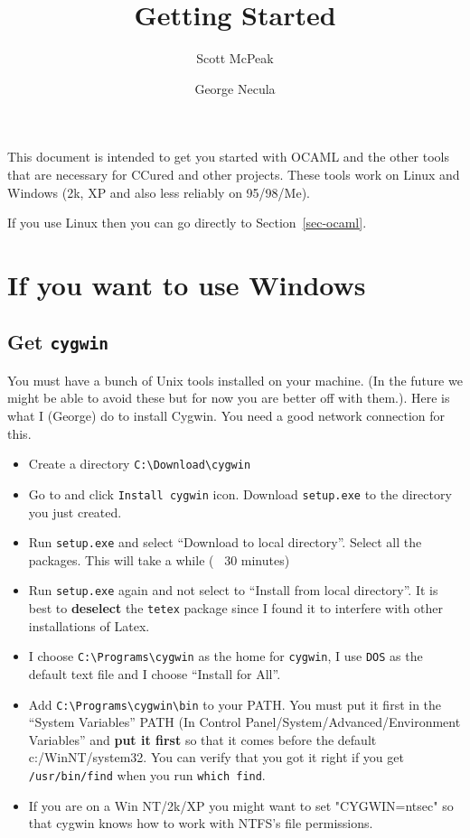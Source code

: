 \documentclass{article}
\title{Getting Started}
\author{Scott McPeak \and George Necula}
\def\t#1{{\tt #1}}
\begin{document}
\maketitle

 This document is intended to get you started with OCAML and the other tools
that are necessary for CCured and other projects. These tools work on Linux
and Windows (2k, XP and also less reliably on 95/98/Me).

 If you use Linux then you can go directly to Section~\ref{sec-ocaml}.

\section{If you want to use Windows}

 \subsection{Get \t{cygwin}}

 You must have a bunch of Unix tools installed on your machine. (In the future
we might be able to avoid these but for now you are better off with them.).
Here is what I (George) do to install Cygwin. You need a good network
connection for this. 
\begin{itemize}
\item Create a directory \t{C:\backslash Download\backslash cygwin}
\item Go to  and click \t{Install
cygwin} icon. Download \t{setup.exe} to the directory you just created.
\item Run \t{setup.exe} and select ``Download to local directory''. Select all
the packages. This will take a while (~ 30 minutes)
\item Run \t{setup.exe} again and not select to ``Install from local
directory''. It is best to {\bf deselect} the \t{tetex} package since I found
it to interfere with other installations of Latex.
\item I choose \t{C:\backslash Programs\backslash cygwin} 
as the home for \t{cygwin}, I use \t{DOS} as the default text file and I
choose ``Install for All''. 
\item Add \t{C:\backslash Programs\backslash cygwin\backslash bin} to your
PATH. You must put it first in the ``System Variables'' PATH (In Control Panel/System/Advanced/Environment
Variables'' and {\bf put it first} so that it comes before the default
c:/WinNT/system32. You can verify that you got it right if you get
\t{/usr/bin/find} when you run \t{which find}. 
\item If you are on a Win NT/2k/XP you might want to set "CYGWIN=ntsec" so
that cygwin knows how to work with NTFS's file permissions.
\end{itemize}
\end{document}
